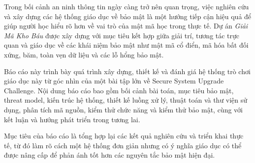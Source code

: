 
Trong bối cảnh an ninh thông tin ngày càng trở nên quan trọng, việc nghiên cứu và xây dựng các hệ thống giáo dục về bảo mật là một hướng tiếp cận hiệu quả để giúp người học hiểu rõ hơn về vai trò của mật mã học trong thực tế. Dự án \textit{Giải Mã Kho Báu} được xây dựng với mục tiêu kết hợp giữa giải trí, tương tác trực quan và giáo dục về các khái niệm bảo mật như mật mã cổ điển, mã hóa bất đối xứng, băm, toàn vẹn dữ liệu và các lỗ hổng bảo mật.

Báo cáo này trình bày quá trình xây dựng, thiết kế và đánh giá hệ thống trò chơi giáo dục này từ góc nhìn của một bài tập lớn về Secure System Upgrade Challenge. Nội dung báo cáo bao gồm bối cảnh bài toán, mục tiêu bảo mật, threat model, kiến trúc hệ thống, thiết kế luồng xử lý, thuật toán và thư viện sử dụng, phân tích mã nguồn, kiểm thử chức năng và kiểm thử bảo mật, cùng với kết luận và hướng phát triển trong tương lai.

Mục tiêu của báo cáo là tổng hợp lại các kết quả nghiên cứu và triển khai thực tế, từ đó làm rõ cách một hệ thống đơn giản nhưng có ý nghĩa giáo dục có thể được nâng cấp để phản ánh tốt hơn các nguyên tắc bảo mật hiện đại.
